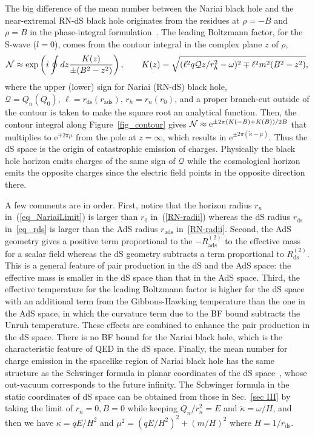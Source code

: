 \documentclass[aps,nofootinbib,superscriptaddress
]{revtex4}
\begin{document}
The big difference of the mean number between the Nariai black hole and the near-extremal RN-dS black hole originates from the residues at $\rho = -B$ and $\rho = B$ in the phase-integral formulation~\cite{Kim:2013cka}. The leading Boltzmann factor, for the S-wave ($l = 0$), comes from the contour integral in the complex plane $z$ of $\rho$,
\begin{eqnarray}
{\cal N} \approx \exp\left( i \oint dz \frac{K(z)}{\pm (B^2 - z^2)} \right), \qquad K(z) = \sqrt{(\ell^2 q \mathcal{Q} z/r_h^2 - \omega)^2 \mp \ell^2 m^2 (B^2 - z^2)},
\end{eqnarray}
where the upper (lower) sign for Nariai (RN-dS) black hole, $\mathcal{Q} = Q_n (Q_0), \, \ell = r_{\mathrm{ds}} (r_{\mathrm{ads}}), \, r_h = r_n (r_0)$, and a proper branch-cut outside of the contour is taken to make the square root an analytical function. Then, the contour integral along Figure~\ref{fig_contour} gives ${\cal N} \approx \mathrm{e}^{\pm 2 \pi (K(-B) + K(B))/2B}$ that multiplies to $\mathrm{e}^{\mp 2 \pi \mu}$ from the pole at $z = \infty$, which results in $\mathrm{e}^{\pm 2 \pi (\tilde{\kappa} - \mu)}$. Thus the dS space is the origin of catastrophic emission of charges. Physically the black hole horizon emits charges of the same sign of $\mathcal{Q}$ while the cosmological horizon emits the opposite charges since the electric field points in the opposite direction there.


A few comments are in order.
First, notice that the horizon radius $r_n$ in~(\ref{eq_NariaiLimit}) is larger than $r_0$ in~(\ref{RN-radii}) whereas the dS radius $r_\mathrm{ds}$ in~\eqref{eq_rds} is larger than the AdS radius $r_\mathrm{ads}$ in~\eqref{RN-radii}.
Second, the AdS geometry gives a positive term proportional to the $- R^{(2)}_{\mathrm{ads}}$ to the effective mass for a scalar field whereas the dS geometry subtracts a term proportional to $R^{(2)}_{\mathrm{ds}}$. This is a general feature of pair production in the dS and the AdS space: the effective mass is smaller in the dS space than that in the AdS space. Third, the effective temperature for the leading Boltzmann factor is higher for the dS space with an additional term from the Gibbons-Hawking temperature than the one in the AdS space, in which the curvature term due to the BF bound subtracts the Unruh temperature. These effects are combined to enhance the pair production in the dS space. There is no BF bound for the Nariai black hole, which is the characteristic feature of QED in the dS space.
Finally, the mean number for charge emission in the spacelike region of Nariai black hole has the same structure as the Schwinger formula in planar coordinates of the dS space~\cite{Cai:2014qba}, whose out-vacuum corresponds to the future infinity. The Schwinger formula in the static coordinates of dS space can be obtained from those in Sec.~\ref{sec III} by taking the limit of $r_n = 0, B = 0$ while keeping $Q_n/r_n^2 = E$ and $\tilde{\kappa} = \omega/H$, and then we have $\kappa = q E/H^2$ and $\mu^2 = (q E/H^2)^2 + (m/H)^2$ where $H = 1/r_\mathrm{ds}$.
\end{document}

